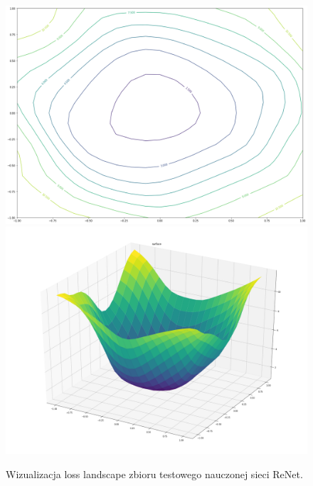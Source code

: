 \documentclass[oneside, mag]{mgr}
\begin{document}
\begin{figure}
\centering
	\includegraphics[width=1.0\textwidth]{img/loss_ReNet.png}
	\includegraphics[width=1.0\textwidth]{img/loss_3d_ReNet.png}
	\caption{Wizualizacja loss landscape zbioru testowego nauczonej sieci ReNet.}
	\label{fig:loss_ReNet}
\end{figure}
\end{document}
